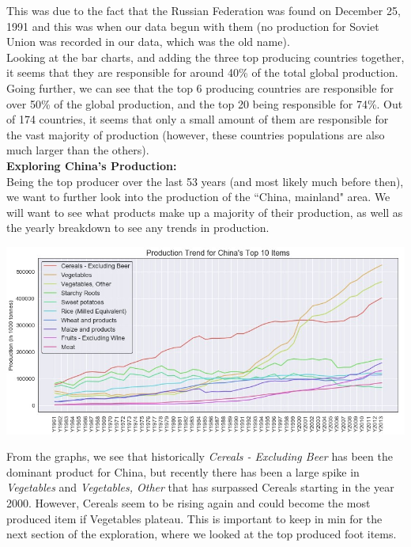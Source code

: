 \documentclass[12pt, a4paper]{article}
\begin{document}
\begin{spacing}{1.1}
	
	\noindent This was due to the fact that the Russian Federation was found on December 25, 1991 and this was when our data begun with them (no production for Soviet Union was recorded in our data, which was the old name).\vspace*{2mm}\\
	Looking at the bar charts, and adding the three top producing countries together, it seems that they are responsible for around 40\% of the total global production. Going further, we can see that the top 6 producing countries are responsible for over 50\% of the global production, and the top 20 being responsible for 74\%. Out of 174 countries, it seems that only a small amount of them are responsible for the vast majority of production (however, these countries populations are also much larger than the others). \vspace*{6mm}\\
	\textbf{Exploring China's Production:}\\
	Being the top producer over the last 53 years (and most likely much before then), we want to further look into the production of the ``China, mainland" area. We will want to see what products make up a majority of their production, as well as the yearly breakdown to see any trends in production.
	\begin{center}
	\includegraphics[scale=.65]{china_prod} 
	\end{center}
	From the graphs, we see that historically \textit{Cereals - Excluding Beer} has been the dominant product for China, but recently there has been a large spike in \textit{Vegetables} and \textit{Vegetables, Other} that has surpassed Cereals starting in the year 2000. However, Cereals seem to be rising again and could become the most produced item if Vegetables plateau. This is important to keep in min for the next section of the exploration, where we looked at the top produced foot items. \newpage
	

\end{spacing}
\end{document}
